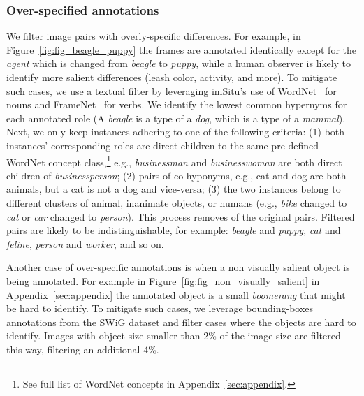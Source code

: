 \documentclass[letterpaper]{article} \usepackage{aaai23}  \usepackage{times}  \usepackage{helvet}  \usepackage{courier}  \usepackage[hyphens]{url}  \usepackage{graphicx} \urlstyle{rm} \def\UrlFont{\rm}  \usepackage{natbib}  \usepackage{caption} \frenchspacing  \setlength{\pdfpagewidth}{8.5in}  \setlength{\pdfpageheight}{11in}  \usepackage{algorithm}
\begin{document}
\subsubsection{Over-specified annotations}
We filter image pairs with overly-specific differences. For example, in Figure~\ref{fig:fig_beagle_puppy} the frames are annotated identically except for the \emph{agent} which is changed from \emph{beagle} to \emph{puppy}, while a human observer is likely to identify more salient differences (leash color, activity, and more). To mitigate such cases, we use a textual filter by leveraging imSitu's use of WordNet~\cite{miller1995wordnet} for nouns and FrameNet~\cite{fillmore2003background} for verbs. We identify the lowest common hypernyms for each annotated role (A \emph{beagle} is a type of a \emph{dog}, which is a type of a \emph{mammal}). Next, we only keep instances adhering to one of the following criteria: (1) both instances' corresponding roles are direct children to the same pre-defined WordNet concept class,\footnote{See full list of WordNet concepts in Appendix~\ref{sec:appendix}.} e.g., \emph{businessman} and \emph{businesswoman} are both direct children of \emph{businessperson}; (2) pairs of co-hyponyms, e.g., cat and dog are both animals, but a cat is not a dog and vice-versa; (3) the two instances belong to different clusters of animal, inanimate objects, or humans (e.g., \emph{bike} changed to \emph{cat} or \emph{car} changed to \emph{person}). This process removes  of the original pairs. Filtered pairs are likely to be indistinguishable, for example: \emph{beagle} and \emph{puppy}, \emph{cat} and \emph{feline}, \emph{person} and \emph{worker}, and so on.

Another case of over-specific annotations is when a non visually salient object is being annotated. For example in Figure~\ref{fig:fig_non_visually_salient} in Appendix~\ref{sec:appendix} the annotated object is a small \emph{boomerang} that might be hard to identify. To mitigate such cases, we leverage bounding-boxes annotations from the SWiG dataset \cite{pratt2020grounded} and filter cases where the objects are hard to identify. Images with object size smaller than 2\% of the image size are filtered this way, filtering an additional 4\%.
\end{document}
